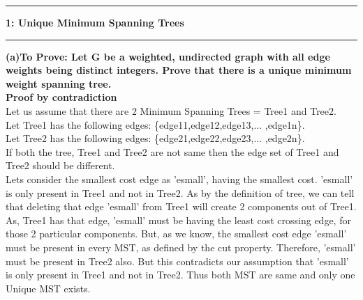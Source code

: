 \documentclass[11pt]{article}
\newcommand\question[2]{\vspace{.25in}\hrule\textbf{#1: #2}\vspace{.5em}\hrule\vspace{.10in}}
\renewcommand\part[1]{\vspace{.10in}\textbf{(#1)}}
\begin{document}
\raggedright
\newcommand\NAME{Aishwarya Asesh}  %
\newcommand\UID{u1063384}     %
\newcommand\HWNUM{4}              %



\question{1}{Unique Minimum Spanning Trees}
\part{a}{\bf To Prove: Let G be a weighted, undirected graph with all edge weights being distinct integers. Prove that there is a unique minimum weight spanning tree.}\\[10pt]
{\bf Proof by contradiction}\\
Let us assume that there are 2 Minimum Spanning Trees = Tree1 and Tree2.\\
Let Tree1 has the following edges: \{edge11,edge12,edge13,... ,edge1n\}.\\
Let Tree2 has the following edges: \{edge21,edge22,edge23,... ,edge2n\}.\\
If both the tree, Tree1 and Tree2 are not same then the edge set of Tree1 and Tree2 should be different.\\
Lets consider the smallest cost edge as 'esmall', having the smallest cost. 'esmall' is only present in Tree1 and not in Tree2. As by the definition of tree, we can tell that deleting that edge 'esmall' from Tree1 will create 2 components out of Tree1. As, Tree1 has that edge, 'esmall' must be having the least cost crossing edge, for those 2 particular components. But, as we know, the smallest cost edge 'esmall' must be present in every MST, as defined by the cut property. Therefore, 'esmall' must be present in Tree2 also. But this contradicts our assumption that 'esmall' is only present in Tree1 and not in Tree2. Thus both MST are same and only one Unique MST exists.\\
\end{document}
